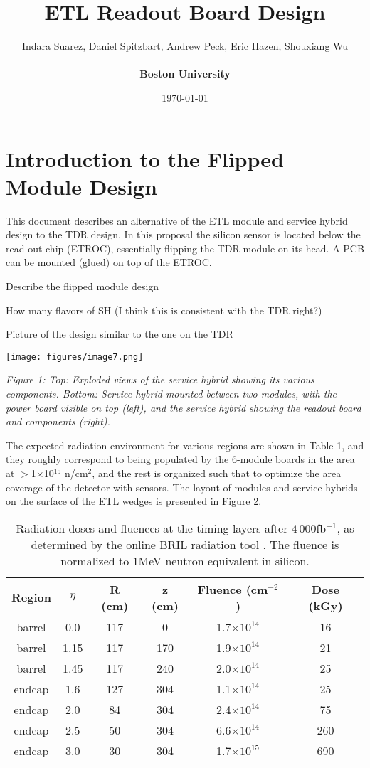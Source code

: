 \documentclass[11pt]{article}
\title{ETL Readout Board Design}
\author{Indara Suarez, Daniel Spitzbart, Andrew Peck, Eric Hazen, Shouxiang Wu
  \\
  \\ \Large{\textbf{Boston University}}}
\date{\today}
\begin{document}
\maketitle

\tableofcontents

\section{Introduction to the Flipped Module Design}

This document describes an alternative of the ETL module and service hybrid design to the TDR design. In this proposal the silicon sensor is located below the read out chip (ETROC), essentially flipping the TDR module on its head. A PCB can be mounted (glued) on top of the ETROC.

Describe the flipped module design

How many flavors of SH (I think this is consistent with the TDR right?)

Picture of the design similar to the one on the TDR

\texttt{[image: figures/image7.png]}

\emph{Figure 1: Top: Exploded views of the service hybrid showing its various components. Bottom: Service hybrid mounted between two modules, with the power board visible on top (left), and the service hybrid showing the readout board and components (right).}

The expected radiation environment for various regions are shown in Table 1, and they roughly correspond to being populated by the 6-module boards in the area at $>$1$\times$10$^{15}$ n/cm$^{2}$, and the rest is organized such that to optimize the area coverage of the detector with sensors. The layout of modules and service hybrids on the surface of the ETL wedges is presented in Figure 2.

\begin{table}
\centering
\caption{Radiation doses and fluences at the timing layers after $4\,000$fb$^{-1}$, as determined by the online BRIL radiation tool \cite{DP2013_028}. The fluence is normalized to $1$MeV neutron equivalent in silicon.}
\label{table:radiationField}
\begin{tabular}{ c c c c c c }
Region & $\eta$ & R (cm) & z (cm) & Fluence (cm$^{-2}$) & Dose (kGy) \\
\midrule
barrel & 0.0    & 117    & 0      & 1.7$\times 10^{14}$ & 16 \\
barrel & 1.15   & 117    & 170    & 1.9$\times 10^{14}$ & 21 \\
barrel & 1.45   & 117    & 240    & 2.0$\times 10^{14}$ & 25 \\
endcap & 1.6    & 127    & 304    & 1.1$\times 10^{14}$ & 25 \\
endcap & 2.0    & 84     & 304    & 2.4$\times 10^{14}$ & 75 \\
endcap & 2.5    & 50     & 304    & 6.6$\times 10^{14}$ & 260 \\
endcap & 3.0    & 30     & 304    & 1.7$\times 10^{15}$ & 690 \\
\end{tabular}
\end{table}
\end{document}
